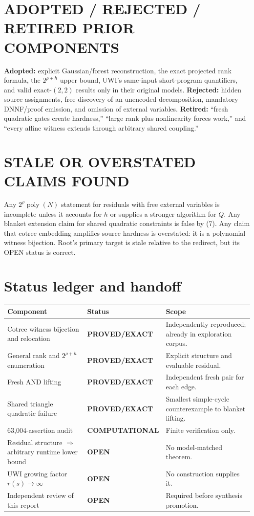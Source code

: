 \documentclass[11pt]{article}
\newcommand{\EXACT}{\textbf{PROVED/EXACT}}
\newcommand{\COMP}{\textbf{COMPUTATIONAL}}
\newcommand{\OPEN}{\textbf{OPEN}}
\begin{document}
\section{ADOPTED / REJECTED / RETIRED PRIOR COMPONENTS}
\textbf{Adopted:} explicit Gaussian/forest reconstruction, the exact projected
rank formula, the $2^{\rho+h}$ upper bound, UWI's same-input short-program
quantifiers, and valid exact-$(2,2)$ results only in their original models.
\textbf{Rejected:} hidden source assignments, free discovery of an unencoded
decomposition, mandatory DNNF/proof emission, and omission of external
variables.  \textbf{Retired:} ``fresh quadratic gates create hardness,''
``large rank plus nonlinearity forces work,'' and ``every affine witness
extends through arbitrary shared coupling.''

\section{STALE OR OVERSTATED CLAIMS FOUND}
Any $2^\rho\operatorname{poly}(N)$ statement for residuals with free external
variables is incomplete unless it accounts for $h$ or supplies a stronger
algorithm for $Q$.  Any blanket extension claim for shared quadratic
constraints is false by (7).  Any claim that cotree embedding amplifies source
hardness is overstated: it is a polynomial witness bijection.  Root's primary
target is stale relative to the redirect, but its OPEN status is correct.

\section{Status ledger and handoff}
\begin{center}\small
\begin{tabularx}{\textwidth}{@{}l l X@{}}
\toprule
Component & Status & Scope\\
\midrule
Cotree witness bijection and relocation & \EXACT & Independently reproduced; already in exploration corpus.\\
General rank and $2^{\rho+h}$ enumeration & \EXACT & Explicit structure and evaluable residual.\\
Fresh AND lifting & \EXACT & Independent fresh pair for each edge.\\
Shared triangle quadratic failure & \EXACT & Smallest simple-cycle counterexample to blanket lifting.\\
63,004-assertion audit & \COMP & Finite verification only.\\
Residual structure $\Rightarrow$ arbitrary runtime lower bound & \OPEN & No model-matched theorem.\\
UWI growing factor $r(s)\to\infty$ & \OPEN & No construction supplies it.\\
Independent review of this report & \OPEN & Required before synthesis promotion.\\
\bottomrule
\end{tabularx}
\end{center}
\end{document}
